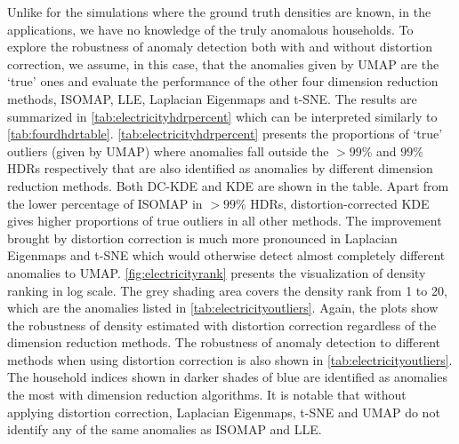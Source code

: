 \documentclass[12pt]{article}
\begin{document}
Unlike for the simulations where the ground truth densities are known, in the applications, we have no knowledge of the truly anomalous households. To explore the robustness of anomaly detection both with and without distortion correction, we assume, in this case, that the anomalies given by UMAP are the `true' ones and evaluate the performance of the other four dimension reduction methods, ISOMAP, LLE, Laplacian Eigenmaps and t-SNE. The results are summarized in \autoref{tab:electricityhdrpercent} which can be interpreted similarly to \autoref{tab:fourdhdrtable}. \autoref{tab:electricityhdrpercent} presents the proportions of `true' outliers (given by UMAP) where anomalies fall outside the \(>99\%\) and \(99\%\) HDRs respectively that are also identified as anomalies by different dimension reduction methods. Both DC-KDE and KDE are shown in the table. Apart from the lower percentage of ISOMAP in \(>99\%\) HDRs, distortion-corrected KDE gives higher proportions of true outliers in all other methods. The improvement brought by distortion correction is much more pronounced in Laplacian Eigenmaps and t-SNE which would otherwise detect almost completely different anomalies to UMAP. \autoref{fig:electricityrank} presents the visualization of density ranking in log scale. The grey shading area covers the density rank from 1 to 20, which are the anomalies listed in \autoref{tab:electricityoutliers}. Again, the plots show the robustness of density estimated with distortion correction regardless of the dimension reduction methods. The robustness of anomaly detection to different methods when using distortion correction is also shown in \autoref{tab:electricityoutliers}. The household indices shown in darker shades of blue are identified as anomalies the most with dimension reduction algorithms. It is notable that without applying distortion correction, Laplacian Eigenmaps, t-SNE and UMAP do not identify any of the same anomalies as ISOMAP and LLE.
\end{document}
